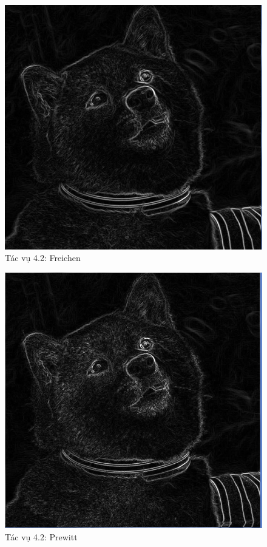 \documentclass{article}
\begin{document}
		\begin{figure}[H]
			\centering
			\includegraphics[scale = 0.4]{42freichen}
			\caption{Tác vụ 4.2: Freichen}
		\end{figure}
		\begin{figure}[H]
			\centering
			\includegraphics[scale = 0.4]{42prewitt}
			\caption{Tác vụ 4.2: Prewitt}
		\end{figure}
\end{document}
